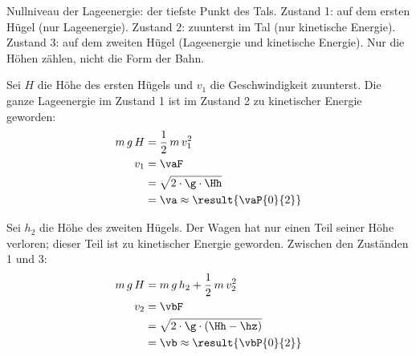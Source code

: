 Nullniveau der Lageenergie: der tiefste Punkt des Tals. Zustand 1: auf dem ersten Hügel (nur Lageenergie). Zustand 2: zuunterst im Tal (nur kinetische Energie). Zustand 3: auf dem zweiten Hügel (Lageenergie und kinetische Energie). Nur die Höhen zählen, nicht die Form der Bahn.

\begin{abcliste}
\abc
Sei $H$ die Höhe des ersten Hügels und $v_1$ die Geschwindigkeit zuunterst. Die ganze Lageenergie im Zustand 1 ist im Zustand 2 zu kinetischer Energie geworden:
\begin{align}
 m\,g\,H &= \frac{1}{2}\,m\,v_1^2 \\
 v_1 &= \vaF \\
   &= \sqrt{2\cdot\g\cdot\Hh} \\
   &= \va \approx \result{\vaP{0}{2}}
\end{align}

\abc
Sei $h_2$ die Höhe des zweiten Hügels. Der Wagen hat nur einen Teil seiner Höhe verloren; dieser Teil ist zu kinetischer Energie geworden. Zwischen den Zuständen 1 und 3:
\begin{align}
 m\,g\,H &= m\,g\,h_2 + \frac{1}{2}\,m\,v_2^2 \\
 v_2 &= \vbF \\
   &= \sqrt{2\cdot\g\cdot(\Hh-\hz)} \\
   &= \vb \approx \result{\vbP{0}{2}}
\end{align}
\end{abcliste}
